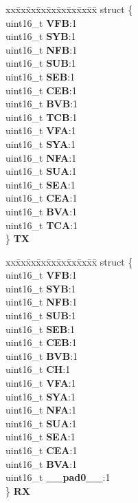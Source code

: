 \begin{DoxyCompactItemize}
\begin{tabbing}
\end{tabbing}\item 
\mbox{\label{unionuS__STSTUS_a157e3b2ca19bae6faecb417e17ac0676}} 
\begin{tabbing}
xx\=xx\=xx\=xx\=xx\=xx\=xx\=xx\=xx\=\kill
struct \{\\
\>uint16\_t {\bfseries VFB}:1\\
\>uint16\_t {\bfseries SYB}:1\\
\>uint16\_t {\bfseries NFB}:1\\
\>uint16\_t {\bfseries SUB}:1\\
\>uint16\_t {\bfseries SEB}:1\\
\>uint16\_t {\bfseries CEB}:1\\
\>uint16\_t {\bfseries BVB}:1\\
\>uint16\_t {\bfseries TCB}:1\\
\>uint16\_t {\bfseries VFA}:1\\
\>uint16\_t {\bfseries SYA}:1\\
\>uint16\_t {\bfseries NFA}:1\\
\>uint16\_t {\bfseries SUA}:1\\
\>uint16\_t {\bfseries SEA}:1\\
\>uint16\_t {\bfseries CEA}:1\\
\>uint16\_t {\bfseries BVA}:1\\
\>uint16\_t {\bfseries TCA}:1\\
\} {\bfseries TX}\\

\end{tabbing}\item 
\mbox{\label{unionuS__STSTUS_a8396ee6e32f9224913c1b87cbf6be82b}} 
\begin{tabbing}
xx\=xx\=xx\=xx\=xx\=xx\=xx\=xx\=xx\=\kill
struct \{\\
\>uint16\_t {\bfseries VFB}:1\\
\>uint16\_t {\bfseries SYB}:1\\
\>uint16\_t {\bfseries NFB}:1\\
\>uint16\_t {\bfseries SUB}:1\\
\>uint16\_t {\bfseries SEB}:1\\
\>uint16\_t {\bfseries CEB}:1\\
\>uint16\_t {\bfseries BVB}:1\\
\>uint16\_t {\bfseries CH}:1\\
\>uint16\_t {\bfseries VFA}:1\\
\>uint16\_t {\bfseries SYA}:1\\
\>uint16\_t {\bfseries NFA}:1\\
\>uint16\_t {\bfseries SUA}:1\\
\>uint16\_t {\bfseries SEA}:1\\
\>uint16\_t {\bfseries CEA}:1\\
\>uint16\_t {\bfseries BVA}:1\\
\>uint16\_t {\bfseries \_\_pad0\_\_}:1\\
\} {\bfseries RX}\\


\end{tabbing}
\end{DoxyCompactItemize}
